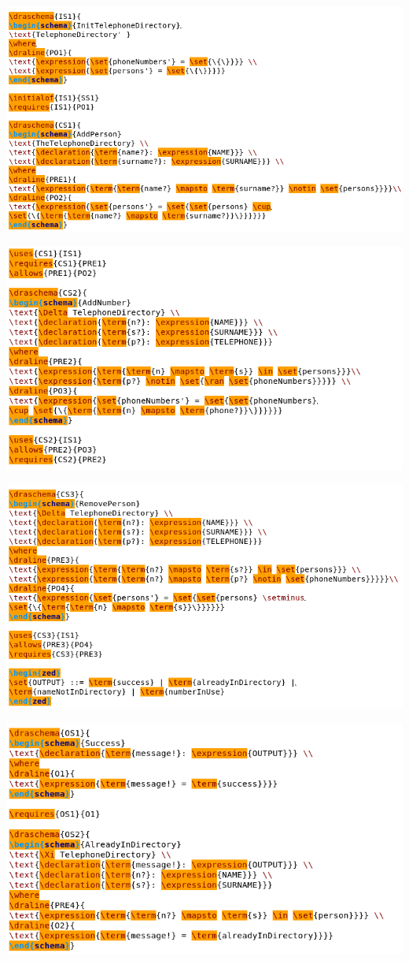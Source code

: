 \noindent \includegraphics[scale=0.5]{examples/nonworkzcga/1n2imageb.png}

\noindent \includegraphics[scale=0.5]{examples/nonworkzcga/1n2imagec.png}

\noindent \includegraphics[scale=0.5]{examples/nonworkzcga/1n2imaged.png}

\noindent \includegraphics[scale=0.5]{examples/nonworkzcga/1n2imagee.png}


